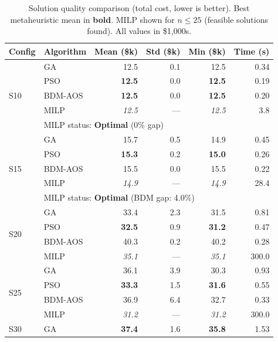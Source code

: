 \begin{table}[t]
\centering
\caption{Solution quality comparison (total cost, lower is better). Best metaheuristic mean in \textbf{bold}. MILP shown for $n \leq 25$ (feasible solutions found). All values in \$1{,}000s.}
\label{tab:results}
\small
\setlength{\tabcolsep}{4pt}
\begin{tabular}{ll rrrr}
\toprule
\textbf{Config} & \textbf{Algorithm} & \textbf{Mean (\$k)} & \textbf{Std (\$k)} & \textbf{Min (\$k)} & \textbf{Time (s)} \\
\midrule
\multirow{5}{*}{S10}
  & GA           & 12.5  & 0.1   & 12.5  & 0.34 \\
  & PSO          & \textbf{12.5}  & 0.0   & \textbf{12.5}  & 0.19 \\
  & BDM-AOS      & \textbf{12.5}  & 0.0   & \textbf{12.5}  & 0.20 \\
  & MILP         & \textit{12.5}  & ---   & \textit{12.5}  & 3.8 \\
  & \multicolumn{4}{l}{\footnotesize MILP status: \textbf{Optimal} (0\% gap)} \\
\midrule
\multirow{5}{*}{S15}
  & GA           & 15.7  & 0.5   & 14.9  & 0.45 \\
  & PSO          & \textbf{15.3}  & 0.2   & \textbf{15.0}  & 0.26 \\
  & BDM-AOS      & 15.5  & 0.0   & 15.5  & 0.22 \\
  & MILP         & \textit{14.9}  & ---   & \textit{14.9}  & 28.4 \\
  & \multicolumn{4}{l}{\footnotesize MILP status: \textbf{Optimal} (BDM gap: 4.0\%)} \\
\midrule
\multirow{4}{*}{S20}
  & GA           & 33.4  & 2.3   & 31.5  & 0.81 \\
  & PSO          & \textbf{32.5}  & 0.9   & \textbf{31.2}  & 0.47 \\
  & BDM-AOS      & 40.3  & 0.2   & 40.2  & 0.28 \\
  & MILP         & \textit{35.1}  & ---   & \textit{35.1}  & 300.0 \\
\midrule
\multirow{4}{*}{S25}
  & GA           & 36.1  & 3.9   & 30.3  & 0.93 \\
  & PSO          & \textbf{33.3}  & 1.5   & \textbf{31.6}  & 0.55 \\
  & BDM-AOS      & 36.9  & 6.4   & 32.7  & 0.33 \\
  & MILP         & \textit{31.2}  & ---   & \textit{31.2}  & 300.0 \\
\midrule
\multirow{3}{*}{S30}
  & GA           & \textbf{37.4}  & 1.6   & \textbf{35.8}  & 1.53 \\

\end{tabular}
\end{table}
